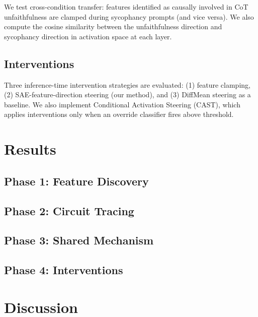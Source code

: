 \documentclass[11pt]{article}
\begin{document}
We test cross-condition transfer: features identified as causally involved in CoT unfaithfulness are clamped during sycophancy prompts (and vice versa). We also compute the cosine similarity between the unfaithfulness direction and sycophancy direction in activation space at each layer.

\subsection{Interventions}

Three inference-time intervention strategies are evaluated: (1) feature clamping, (2) SAE-feature-direction steering (our method), and (3) DiffMean steering \citep{rimsky2024steering} as a baseline. We also implement Conditional Activation Steering (CAST), which applies interventions only when an override classifier fires above threshold.

\section{Results}
\label{sec:results}


\subsection{Phase 1: Feature Discovery}

\subsection{Phase 2: Circuit Tracing}

\subsection{Phase 3: Shared Mechanism}

\subsection{Phase 4: Interventions}

\section{Discussion}
\label{sec:discussion}
\end{document}
